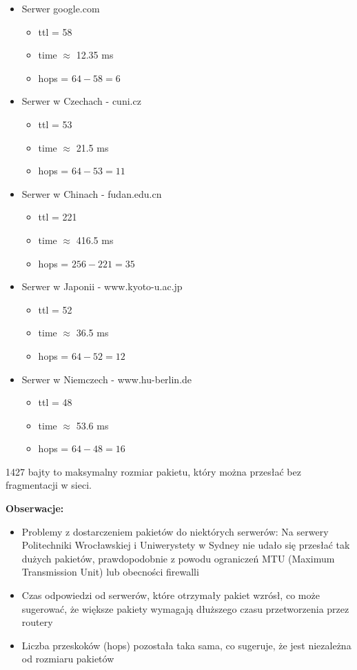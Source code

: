 \documentclass{article}
\begin{document}
\begin{itemize}

    \item Serwer google.com
    \begin{itemize}
        \item ttl = 58
        \item time $\approx$ 12.35 ms
        \item hops = $64 - 58 = 6$
    \end{itemize}

    \item Serwer w Czechach - cuni.cz 
    \begin{itemize}
        \item ttl = 53
        \item time $\approx$ 21.5 ms
        \item hops = $64 - 53 = 11$
    \end{itemize} 
    \item Serwer w Chinach - fudan.edu.cn 
    \begin{itemize}
        \item ttl = 221
        \item time $\approx$ 416.5 ms
        \item hops = $256 - 221 = 35$
    \end{itemize}
    \item Serwer w Japonii - www.kyoto-u.ac.jp
    \begin{itemize}
        \item ttl = 52
        \item time $\approx$ 36.5 ms
        \item hops = $64 - 52 = 12$
    \end{itemize}
    \item Serwer w Niemczech - www.hu-berlin.de
    \begin{itemize}
        \item ttl = 48
        \item time $\approx$ 53.6 ms
        \item hops = $64 - 48 = 16$
    \end{itemize}
\end{itemize}
1427 bajty to maksymalny rozmiar pakietu, który można przesłać bez fragmentacji w sieci. \par
\vspace{1\baselineskip}
\textbf{Obserwacje: }
\vspace{1\baselineskip}
\begin{itemize}
    \item Problemy z dostarczeniem pakietów do niektórych serwerów: Na serwery Politechniki Wrocławskiej i Uniwerystety w Sydney nie udało
    się przesłać tak dużych pakietów, prawdopodobnie z powodu ograniczeń MTU (Maximum Transmission Unit) lub obecności firewalli
    \item Czas odpowiedzi od serwerów, które otrzymały pakiet wzrósł, co może sugerować, że większe pakiety wymagają dłuższego czasu
    przetworzenia przez routery
    \item Liczba przeskoków (hops) pozostała taka sama, co sugeruje, że jest niezależna od rozmiaru pakietów
\end{itemize}
\end{document}
